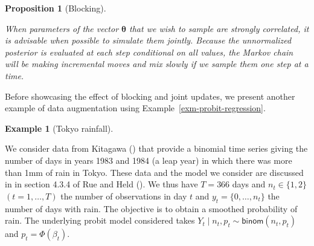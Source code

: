 \documentclass[
  11pt,
  letterpaper,
]{scrbook}
\theoremstyle{definition}
\newtheorem{example}{Example}[chapter]
\theoremstyle{plain}
\newtheorem{proposition}{Proposition}[chapter]
\theoremstyle{plain}
\theoremstyle{plain}
\theoremstyle{definition}
\theoremstyle{definition}
\theoremstyle{plain}
\newtheorem{proposition}{Proposition}[chapter]
\theoremstyle{plain}
\theoremstyle{remark}
\begin{document}
\begin{proposition}[Blocking]\protect\hypertarget{prp-blocking}{}\label{prp-blocking}

When parameters of the vector \(\boldsymbol{\theta}\) that we wish to
sample are strongly correlated, it is advisable when possible to
simulate them jointly. Because the unnormalized posterior is evaluated
at each step conditional on all values, the Markov chain will be making
incremental moves and mix slowly if we sample them one step at a time.

\end{proposition}

Before showcasing the effect of blocking and joint updates, we present
another example of data augmentation using
Example~\ref{exm-probit-regression}.

\begin{example}[Tokyo
rainfall]\protect\hypertarget{exm-Tokyo-rainfall}{}\label{exm-Tokyo-rainfall}

We consider data from Kitagawa () that
provide a binomial time series giving the number of days in years 1983
and 1984 (a leap year) in which there was more than 1mm of rain in
Tokyo. These data and the model we consider are discussed in in section
4.3.4 of Rue and Held (). We thus have
\(T=366\) days and \(n_t \in \{1,2\}\) \((t=1, \ldots, T)\) the number
of observations in day \(t\) and \(y_t=\{0,\ldots, n_t\}\) the number of
days with rain. The objective is to obtain a smoothed probability of
rain. The underlying probit model considered takes
\(Y_t \mid n_t, p_t \sim \mathsf{binom}(n_t, p_t)\) and
\(p_t = \Phi(\beta_t).\)


\end{example}
\end{document}
